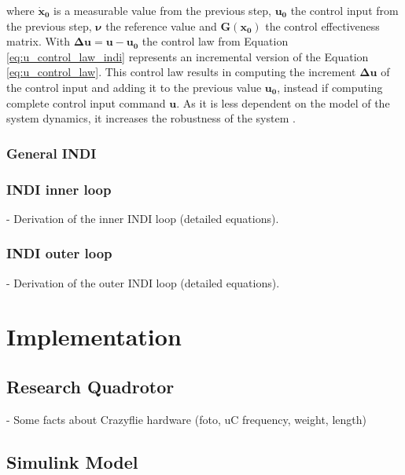 \documentclass[11pt, a4paper, twoside]{report}
\begin{document}
where $\bm{\dot{x}_0}$ is a measurable value from the previous step, $\bm{u_0}$ the control input from the previous step, $\bm{\nu}$ the reference value and $\bm{G(x_0)}$ the control effectiveness matrix. With $\bm{\Delta u=u-u_0}$ the control law from Equation \ref{eq:u_control_law_indi} represents an incremental version of the Equation \ref{eq:u_control_law}. This control law results in computing the increment $\bm{\Delta u}$ of the control input and adding it to the previous value $\bm{u_0}$, instead if computing complete control input command $\bm{u}$. As it is less dependent on the model of the system dynamics, it increases the robustness of the system \cite{Sieberling}.

\subsection{General INDI} \label{subsec: indi_general}

\subsection{INDI inner loop} \label{subsec: indi_inner}

- Derivation of the inner INDI loop (detailed equations).

\subsection{INDI outer loop} \label{subsec: indi_outer}

- Derivation of the outer INDI loop (detailed equations).



\chapter{Implementation} \label{cha:implementation}

\thispagestyle{fancy}

\section{Research Quadrotor} \label{sec:research_quadrotor}

- Some facts about Crazyflie hardware (foto, uC frequency, weight, length)

\section{Simulink Model} \label{sec:simulink_model}
\end{document}
